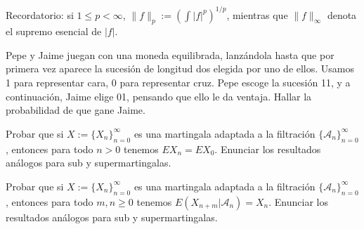 Recordatorio: si $1\le p < \infty$, $\|f\|_p := \left(\int|f|^p\right)^{1/p}$, mientras que
$\|f\|_\infty$ denota el supremo esencial de $|f|$. \

\begin{problem}[1] Pepe y Jaime juegan con una moneda equilibrada, lanz\'andola hasta que por primera vez 
aparece la sucesi\'on  de longitud dos  elegida por uno de ellos. Usamos 1 para representar
cara, 0 para representar cruz.
Pepe escoge la sucesi\'on 11, y a continuaci\'on, Jaime elige  01, pensando que ello le da ventaja. 
Hallar la probabilidad de que gane Jaime.
\solution

\begin{expla}

\end{expla}

\end{problem}


\begin{problem}[2] Probar que si $X := \{X_n\}_{n=0}^{\infty}$  es una martingala adaptada a la filtraci\'on
$\{\mathcal{A}_n\}_{n=0}^{\infty}$, entonces para todo $n>0$ tenemos 
$EX_n = EX_0$. 
Enunciar los resultados an\'alogos para sub y supermartingalas.
\solution

\begin{expla}

\end{expla}

\end{problem}


\begin{problem}[3] Probar que si $X := \{X_n\}_{n=0}^{\infty}$  es una martingala adaptada a la filtraci\'on
$\{\mathcal{A}_n\}_{n=0}^{\infty}$, entonces para todo $m, n\ge 0$ tenemos
$E(X_{n + m}|\mathcal{A}_n) = X_n$. Enunciar los resultados an\'alogos para sub y supermartingalas.
\solution

\begin{expla}

\end{expla}

\end{problem}


